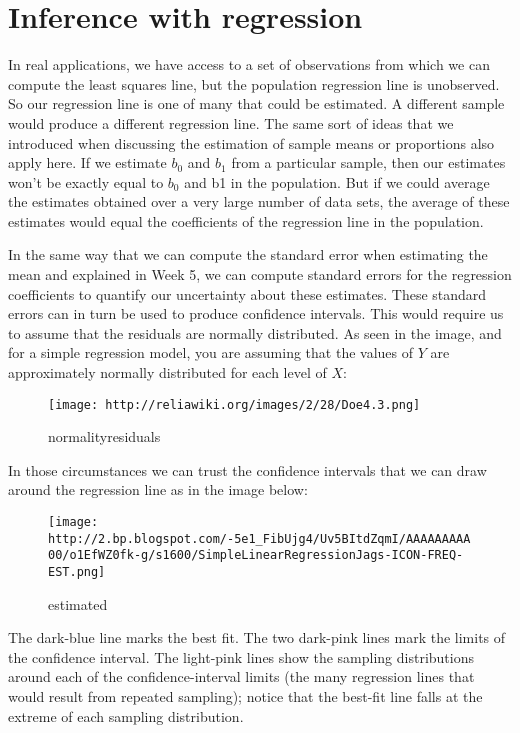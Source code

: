\documentclass[
]{book}
\begin{document}
\section{Inference with regression}\label{inference-with-regression}

In real applications, we have access to a set of observations from which we can compute the least squares line, but the population regression line is unobserved. So our regression line is one of many that could be estimated. A different sample would produce a different regression line. The same sort of ideas that we introduced when discussing the estimation of sample means or proportions also apply here. If we estimate \(b_0\) and \(b_1\) from a particular sample, then our estimates won't be exactly equal to \(b_0\) and b1 in the population. But if we could average the estimates obtained over a very large number of data sets, the average of these estimates would equal the coefficients of the regression line in the population.

In the same way that we can compute the standard error when estimating the mean and explained in Week 5, we can compute standard errors for the regression coefficients to quantify our uncertainty about these estimates. These standard errors can in turn be used to produce confidence intervals. This would require us to assume that the residuals are normally distributed. As seen in the image, and for a simple regression model, you are assuming that the values of \(Y\) are approximately normally distributed for each level of \(X\):

\begin{figure}
\centering
\texttt{[image: http://reliawiki.org/images/2/28/Doe4.3.png]}
\caption{normalityresiduals}
\end{figure}

In those circumstances we can trust the confidence intervals that we can draw around the regression line as in the image below:

\begin{figure}
\centering
\texttt{[image: http://2.bp.blogspot.com/-5e1\_FibUjg4/Uv5BItdZqmI/AAAAAAAAA00/o1EfWZ0fk-g/s1600/SimpleLinearRegressionJags-ICON-FREQ-EST.png]}
\caption{estimated}
\end{figure}

The dark-blue line marks the best fit. The two dark-pink lines mark the limits of the confidence interval. The light-pink lines show the sampling distributions around each of the confidence-interval limits (the many regression lines that would result from repeated sampling); notice that the best-fit line falls at the extreme of each sampling distribution.
\end{document}
